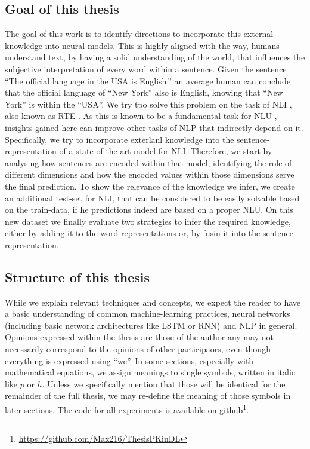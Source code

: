 \subsection{Goal of this thesis}
The goal of this work is to identify directions to incorporate this external knowledge into neural models. This is highly aligned with the way, humans understand text, by having a solid understanding of the world, that influences the subjective interpretation of every word within a sentence. Given the sentence ``The official language in the USA is English.'' an average human can conclude that the official language of ``New York'' also is English, knowing that ``New York'' is within the ``USA''. We try tpo solve this problem on the task of \ac{NLI} \citep{bowman2015large}, also known as \ac{RTE} \citep{dagan2006pascal}. As this is known to be a fundamental task for \ac{NLU} \citep{maccartney2007natural}, insights gained here can improve other tasks of \ac{NLP} that indirectly depend on it. Specifically, we try to incorporate exterlanl knowledge into the sentence-representation of a state-of-the-art model for \ac{NLI}. Therefore, we start by analysing how sentences are encoded within that model, identifying the role of different dimensions and how the encoded values within those dimensions serve the final prediction. To show the relevance of the knowledge we infer, we create an additional test-set for \ac{NLI}, that can be considered to be easily solvable based on the train-data, if he predictions indeed are based on a proper \ac{NLU}. On this new dataset we finally evaluate two strategies to infer the required knowledge, either by adding it to the word-representations or, by fusin it into the sentence representation.

\subsection{Structure of this thesis}
While we explain relevant techniques and concepts, we expect the reader to have a basic understanding of common machine-learning practices, neural networks (including basic network architectures like \ac{LSTM} or \ac{RNN}) and \ac{NLP} in general. Opinions expressed within the thesis are those of the author any may not necessarily correspond to the opinions of other participaors, even though everything is expressed using ``we''. In some sections, especially with mathematical equations, we assign meanings to single symbols, written in italic like $p$ or $h$. Unless we specifically mention that those will be identical for the remainder of the full thesis, we may re-define the meaning of those symbols in later sections. The code for all experiments is available on github\footnote{\href{https://github.com/Max216/ThesisPKinDL}{https://github.com/Max216/ThesisPKinDL}}.
\newline

